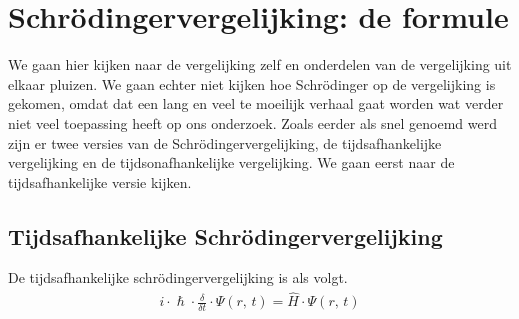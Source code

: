 \documentclass[11pt,fleqn]{book} %
\begin{document}
\section{Schrödingervergelijking: de formule}
We gaan hier kijken naar de vergelijking zelf en onderdelen van de vergelijking uit elkaar pluizen. We gaan echter niet kijken hoe Schrödinger op de vergelijking is gekomen, omdat dat een lang en veel te moeilijk verhaal gaat worden wat verder niet veel toepassing heeft op ons onderzoek. Zoals eerder als snel genoemd werd zijn er twee versies van de Schrödingervergelijking, de tijdsafhankelijke vergelijking en de tijdsonafhankelijke vergelijking. We gaan eerst naar de tijdsafhankelijke versie kijken.

\subsection{Tijdsafhankelijke Schrödingervergelijking}
\begin{definition}\label{eq:tsv}
De tijdsafhankelijke schrödingervergelijking is als volgt.
\begin{align}
i \cdot \hslash \cdot \frac{\delta}{\delta t} \cdot \Psi(r,\,t) = \hat{H} \cdot \Psi(r,\,t)
\end{align}
\end{definition}
\end{document}
